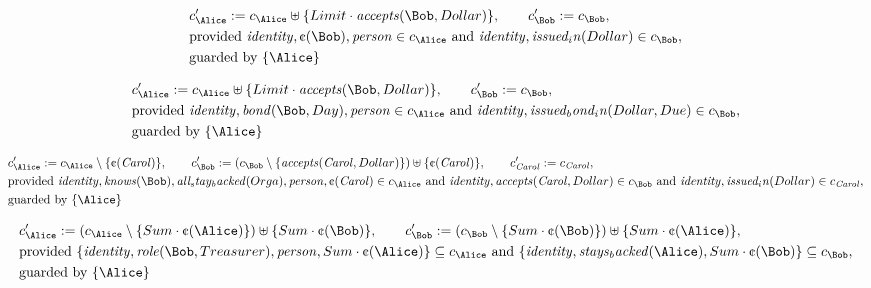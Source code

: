 \begin{align*}
&
c'_
{
\Alice
}
 := 
c_
{
\Alice
}
 \uplus 
\{
Limit
\cdot
\mathit{
accepts
}
(
\Bob
,
Dollar
)
\}
, \qquad 
c'_
{
\Bob
}
 := 
c_
{
\Bob
}
,\\
&
\text{provided } 
\mathit{
identity
}
,
\text{\textcent}
(
\Bob
)
,
\mathit{
person
}
 \in c_
{
\Alice
}
 \text{ and } 
\mathit{
identity
}
,
\mathit{
issued_in
}
(
Dollar
)
 \in c_
{
\Bob
}
,\\
&
\text{guarded by } \{
\Alice
\}
\end{align*}

\begin{align*}
&
c'_
{
\Alice
}
 := 
c_
{
\Alice
}
 \uplus 
\{
Limit
\cdot
\mathit{
accepts
}
(
\Bob
,
Dollar
)
\}
, \qquad 
c'_
{
\Bob
}
 := 
c_
{
\Bob
}
,\\
&
\text{provided } 
\mathit{
identity
}
,
\mathit{
bond
}
(
\Bob
,
Day
)
,
\mathit{
person
}
 \in c_
{
\Alice
}
 \text{ and } 
\mathit{
identity
}
,
\mathit{
issued_bond_in
}
(
Dollar
,
Due
)
 \in c_
{
\Bob
}
,\\
&
\text{guarded by } \{
\Alice
\}
\end{align*}

\begin{align*}
&
c'_
{
\Alice
}
 := 
c_
{
\Alice
}
 \setminus 
\{
\text{\textcent}
(
\mathit{Carol}
)
\}
, \qquad 
c'_
{
\Bob
}
 := 
(c_
{
\Bob
}
 \setminus 
\{
\mathit{
accepts
}
(
\mathit{Carol}
,
Dollar
)
\}
) \uplus 
\{
\text{\textcent}
(
\mathit{Carol}
)
\}
, \qquad 
c'_
{
\mathit{Carol}
}
 := 
c_
{
\mathit{Carol}
}
,\\
&
\text{provided } 
\mathit{
identity
}
,
\mathit{
knows
}
(
\Bob
)
,
\mathit{
all_stay_backed
}
(
Orga
)
,
\mathit{
person
}
,
\text{\textcent}
(
\mathit{Carol}
)
 \in c_
{
\Alice
}
 \text{ and } 
\mathit{
identity
}
,
\mathit{
accepts
}
(
\mathit{Carol}
,
Dollar
)
 \in c_
{
\Bob
}
 \text{ and } 
\mathit{
identity
}
,
\mathit{
issued_in
}
(
Dollar
)
 \in c_
{
\mathit{Carol}
}
,\\
&
\text{guarded by } \{
\Alice
\}
\end{align*}

\begin{align*}
&
c'_
{
\Alice
}
 := 
(c_
{
\Alice
}
 \setminus 
\{
Sum
\cdot
\text{\textcent}
(
\Alice
)
\}
) \uplus 
\{
Sum
\cdot
\text{\textcent}
(
\Bob
)
\}
, \qquad 
c'_
{
\Bob
}
 := 
(c_
{
\Bob
}
 \setminus 
\{
Sum
\cdot
\text{\textcent}
(
\Bob
)
\}
) \uplus 
\{
Sum
\cdot
\text{\textcent}
(
\Alice
)
\}
,\\
&
\text{provided } 
\{
\mathit{
identity
}
,
\mathit{
role
}
(
\Bob
,
Treasurer
)
,
\mathit{
person
}
,
Sum
\cdot
\text{\textcent}
(
\Alice
)
\}
 \subseteq c_
{
\Alice
}
 \text{ and } 
\{
\mathit{
identity
}
,
\mathit{
stays_backed
}
(
\Alice
)
,
Sum
\cdot
\text{\textcent}
(
\Bob
)
\}
 \subseteq c_
{
\Bob
}
,\\
&
\text{guarded by } \{
\Alice
\}
\end{align*}
